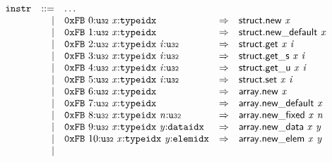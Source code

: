 \vspace{1ex}

$$
\begin{array}{@{}l@{}rrlll@{}l@{}}
& {\mathtt{instr}} &::=& \dots \\ &&|&
\mathtt{0xFB}~0{:}{\mathtt{u{\scriptstyle32}}}~{\mathit{x}}{:}{\mathtt{typeidx}} &\Rightarrow& \mathsf{struct.new}~{\mathit{x}} \\ &&|&
\mathtt{0xFB}~1{:}{\mathtt{u{\scriptstyle32}}}~{\mathit{x}}{:}{\mathtt{typeidx}} &\Rightarrow& \mathsf{struct.new\_default}~{\mathit{x}} \\ &&|&
\mathtt{0xFB}~2{:}{\mathtt{u{\scriptstyle32}}}~{\mathit{x}}{:}{\mathtt{typeidx}}~{\mathit{i}}{:}{\mathtt{u{\scriptstyle32}}} &\Rightarrow& \mathsf{struct.get}~{\mathit{x}}~{\mathit{i}} \\ &&|&
\mathtt{0xFB}~3{:}{\mathtt{u{\scriptstyle32}}}~{\mathit{x}}{:}{\mathtt{typeidx}}~{\mathit{i}}{:}{\mathtt{u{\scriptstyle32}}} &\Rightarrow& {{\mathsf{struct.get}}{\mathsf{\_}}}{\mathsf{s}}~{\mathit{x}}~{\mathit{i}} \\ &&|&
\mathtt{0xFB}~4{:}{\mathtt{u{\scriptstyle32}}}~{\mathit{x}}{:}{\mathtt{typeidx}}~{\mathit{i}}{:}{\mathtt{u{\scriptstyle32}}} &\Rightarrow& {{\mathsf{struct.get}}{\mathsf{\_}}}{\mathsf{u}}~{\mathit{x}}~{\mathit{i}} \\ &&|&
\mathtt{0xFB}~5{:}{\mathtt{u{\scriptstyle32}}}~{\mathit{x}}{:}{\mathtt{typeidx}}~{\mathit{i}}{:}{\mathtt{u{\scriptstyle32}}} &\Rightarrow& \mathsf{struct.set}~{\mathit{x}}~{\mathit{i}} \\ &&|&
\mathtt{0xFB}~6{:}{\mathtt{u{\scriptstyle32}}}~{\mathit{x}}{:}{\mathtt{typeidx}} &\Rightarrow& \mathsf{array.new}~{\mathit{x}} \\ &&|&
\mathtt{0xFB}~7{:}{\mathtt{u{\scriptstyle32}}}~{\mathit{x}}{:}{\mathtt{typeidx}} &\Rightarrow& \mathsf{array.new\_default}~{\mathit{x}} \\ &&|&
\mathtt{0xFB}~8{:}{\mathtt{u{\scriptstyle32}}}~{\mathit{x}}{:}{\mathtt{typeidx}}~{\mathit{n}}{:}{\mathtt{u{\scriptstyle32}}} &\Rightarrow& \mathsf{array.new\_fixed}~{\mathit{x}}~{\mathit{n}} \\ &&|&
\mathtt{0xFB}~9{:}{\mathtt{u{\scriptstyle32}}}~{\mathit{x}}{:}{\mathtt{typeidx}}~{\mathit{y}}{:}{\mathtt{dataidx}} &\Rightarrow& \mathsf{array.new\_data}~{\mathit{x}}~{\mathit{y}} \\ &&|&
\mathtt{0xFB}~10{:}{\mathtt{u{\scriptstyle32}}}~{\mathit{x}}{:}{\mathtt{typeidx}}~{\mathit{y}}{:}{\mathtt{elemidx}} &\Rightarrow& \mathsf{array.new\_elem}~{\mathit{x}}~{\mathit{y}} \\ &&|&

\end{array}$$
